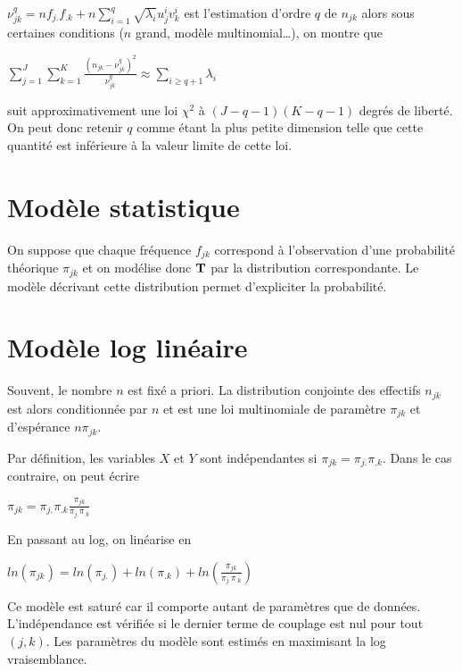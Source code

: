 \documentclass[letterpaper,10pt,english]{jupyterBook}
\begin{document}
\sphinxAtStartPar
\(\nu_{jk}^q = n f_{j.}f_{.k} + n\displaystyle\sum_{i=1}^q \sqrt{\lambda_i} u^i_jv^i_k\)
est l’estimation d’ordre \(q\) de \(n_{jk}\) alors sous certaines conditions (\(n\) grand, modèle multinomial…), on montre que

\sphinxAtStartPar
\(\displaystyle\sum_{j=1}^J\displaystyle\sum_{k=1}^K\frac{\left (n_{jk}-\nu_{jk}^q \right )^2}{\nu_{jk}^q}\approx \displaystyle\sum_{i\geq q+1} \lambda_i\)

\sphinxAtStartPar
suit approximativement une loi \(\chi^2\) à \((J-q-1)(K-q-1)\) degrés de liberté. On peut donc retenir \(q\) comme étant la plus petite dimension telle que cette quantité est inférieure à la valeur limite de cette loi.


\section{Modèle statistique}
\label{\detokenize{afc:modele-statistique}}
\sphinxAtStartPar
On suppose que chaque fréquence \(f_{jk}\) correspond à l’observation d’une probabilité   théorique \(\pi_{jk}\) et on modélise donc \(\bf T\) par la distribution correspondante. Le modèle décrivant cette distribution permet d’expliciter la probabilité.


\section{Modèle log linéaire}
\label{\detokenize{afc:modele-log-lineaire}}
\sphinxAtStartPar
Souvent, le nombre \(n\) est fixé a priori. La distribution conjointe des effectifs \(n_{jk}\) est alors conditionnée par \(n\) et est une loi multinomiale de paramètre \(\pi_{jk}\) et d’espérance \(n\pi_{jk}\).

\sphinxAtStartPar
Par définition, les variables \(X\) et \(Y\) sont indépendantes si \(\pi_{jk}=\pi_{j.}\pi_{.k}\). Dans le cas contraire, on peut écrire

\sphinxAtStartPar
\(\pi_{jk} = \pi_{j.}\pi_{.k}\frac{\pi_{jk}}{\pi_{j.}\pi_{.k}}\)

\sphinxAtStartPar
En passant au log, on linéarise en

\sphinxAtStartPar
\(ln\left (\pi_{jk}\right ) =  ln (\pi_{j.}) + ln (\pi_{.k})  + ln \left( \frac{\pi_{jk}}{\pi_{j.}\pi_{.k}}\right )\)

\sphinxAtStartPar
Ce modèle est saturé car il comporte autant de paramètres que de données.  L’indépendance est vérifiée si le dernier terme de couplage est nul pour tout \((j,k)\). Les paramètres du modèle sont estimés en maximisant la log vraisemblance.
\end{document}
